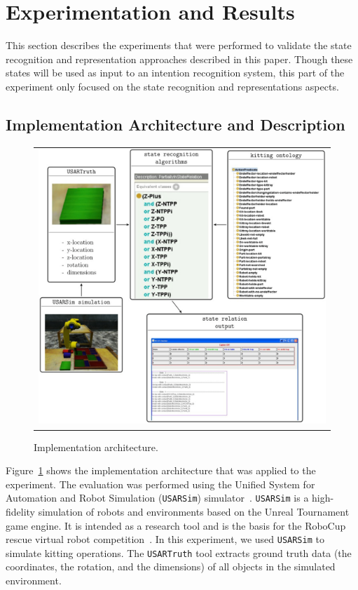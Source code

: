 \documentclass[final,1p,times]{elsarticle}
\begin{document}
\section{Experimentation and Results}\label{S:section5}

This section describes the experiments that were performed to validate the state recognition and representation approaches described in this paper. Though these states will be used as input to an intention recognition system, this part of the experiment only focused on the state recognition and representations aspects.

\subsection{Implementation Architecture and Description}

\begin{figure}[t!h!]
\begin{tabular}{c}
\includegraphics[width=13cm]{architecture.eps}
\end{tabular}
\caption{Implementation architecture.}
\label{fig:architecture}
\end{figure}
Figure~\ref{fig:architecture} shows the implementation architecture that was applied to the experiment. The evaluation was performed using the Unified System for Automation and Robot Simulation (\texttt{USARSim}) simulator~\cite{Carpin.ICRA.2007}. \texttt{USARSim} is a high-fidelity simulation of robots and environments based on the Unreal Tournament game engine. It is intended as a research tool and is the basis for the RoboCup rescue virtual robot competition~\cite{Kitano.ICAA.1997}. In this experiment, we used \texttt{USARSim} to simulate kitting operations. The \texttt{USARTruth} tool extracts ground truth data (the coordinates, the rotation, and the dimensions) of all objects in the simulated environment.
\end{document}
